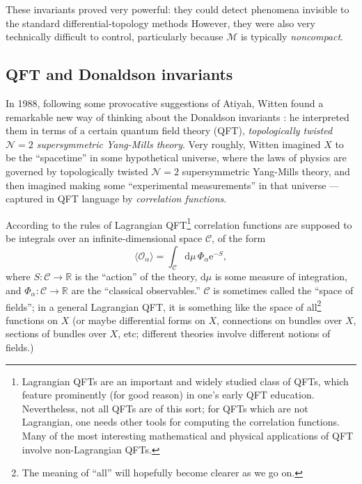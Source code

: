 \documentclass[12pt,letterpaper,reqno]{article}
\numberwithin{equation}{section}
\newcommand{\cC}{\ensuremath{\mathcal C}}
\newcommand{\cM}{\ensuremath{\mathcal M}}
\newcommand{\cO}{\ensuremath{\mathcal O}}
\newcommand{\R}{\ensuremath{\mathbb R}}
\newcommand{\N}{{\mathcal N}}
\newcommand{\e}{{\mathrm e}}
\newcommand{\de}{\mathrm{d}}
\newcommand{\IP}[1]{\langle#1\rangle}
\newcommand{\ti}[1]{\textit{#1}}
\newcommand{\fixme}[1]{{\color{orange}{[#1]}}}
\begin{document}
These invariants proved very powerful: they could detect phenomena invisible to 
the standard differential-topology methods \fixme{explain something proved using them?} 
However, they were also very technically
difficult to control, particularly because $\cM$ is typically
\ti{noncompact}.


\subsection{QFT and Donaldson invariants}

In 1988, following some provocative suggestions of Atiyah,
Witten found a remarkable new way of thinking about
the Donaldson invariants \cite{Witten:1988ze}: he interpreted them
in terms of a certain quantum field theory (QFT),
\ti{topologically twisted $\N=2$ supersymmetric Yang-Mills theory}.
Very roughly, Witten imagined $X$ to be the ``spacetime''
in some hypothetical universe, where the laws of physics are governed
by topologically twisted $\N=2$ supersymmetric Yang-Mills theory,
and then imagined
making some ``experimental measurements'' in that universe --- captured
in QFT language by \ti{correlation functions}.

According to the rules of Lagrangian QFT\footnote{Lagrangian QFTs are an
important and widely studied class of QFTs, which feature prominently
(for good reason) in one's early QFT education. Nevertheless, not
all QFTs are of this sort; for QFTs which are not Lagrangian, one
needs other tools for computing the correlation functions. Many of the
most interesting mathematical and physical applications of QFT
involve non-Lagrangian QFTs.}
correlation functions are supposed to be integrals over an
infinite-dimensional space $\cC$, of the form
\begin{equation} \label{eq:correlator}
 \IP{\cO_\alpha} = \int_\cC \de \mu \, \Phi_\alpha \e^{-S},
\end{equation}
where $S: \cC \to \R$ is the ``action'' of the theory,
$\de \mu$ is some measure of integration,
and $\Phi_\alpha: \cC \to \R$ are the ``classical observables.''
$\cC$ is sometimes called the ``space of fields''; in a general Lagrangian QFT, it is
something like the space of all\footnote{The meaning of ``all'' will
hopefully become clearer as we go on.} functions on $X$ (or maybe differential forms on $X$,
connections on bundles over $X$, sections of bundles over $X$, etc; different theories involve
different notions of fields.) 
\end{document}
